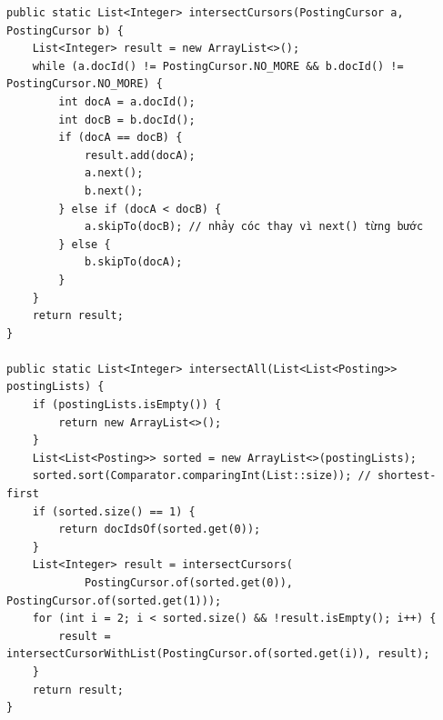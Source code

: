 \documentclass[9pt,twocolumn,a4paper]{extarticle}
\newcommand{\code}[1]{\texttt{#1}}
\begin{document}
\begin{minipage}{\linewidth}
\begin{lstlisting}[caption={\code{query/PostingListMerger.java}, \code{intersectCursors}, \code{intersectAll}: giao posting list, danh sách ngắn trước},label={lst:intersect}]
public static List<Integer> intersectCursors(PostingCursor a, PostingCursor b) {
    List<Integer> result = new ArrayList<>();
    while (a.docId() != PostingCursor.NO_MORE && b.docId() != PostingCursor.NO_MORE) {
        int docA = a.docId();
        int docB = b.docId();
        if (docA == docB) {
            result.add(docA);
            a.next();
            b.next();
        } else if (docA < docB) {
            a.skipTo(docB); // nhảy cóc thay vì next() từng bước
        } else {
            b.skipTo(docA);
        }
    }
    return result;
}

public static List<Integer> intersectAll(List<List<Posting>> postingLists) {
    if (postingLists.isEmpty()) {
        return new ArrayList<>();
    }
    List<List<Posting>> sorted = new ArrayList<>(postingLists);
    sorted.sort(Comparator.comparingInt(List::size)); // shortest-first
    if (sorted.size() == 1) {
        return docIdsOf(sorted.get(0));
    }
    List<Integer> result = intersectCursors(
            PostingCursor.of(sorted.get(0)), PostingCursor.of(sorted.get(1)));
    for (int i = 2; i < sorted.size() && !result.isEmpty(); i++) {
        result = intersectCursorWithList(PostingCursor.of(sorted.get(i)), result);
    }
    return result;
}
\end{lstlisting}
\end{minipage}
\par\vspace{4pt}
\end{document}
